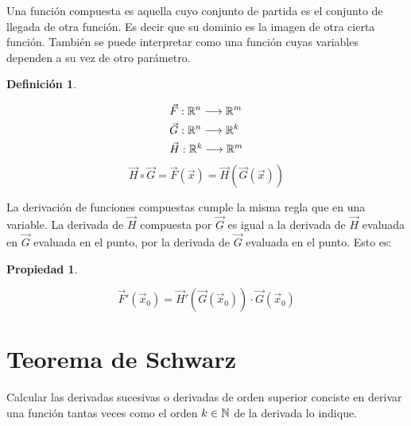 \documentclass[a5paper,12pt,twoside]{book}
\newtheorem{defn}{{Definición}}[chapter]
\newtheorem{prop}{{Propiedad}}[chapter]
\begin{document}
Una función compuesta es aquella cuyo conjunto de partida es el conjunto de llegada de otra función.
Es decir que su dominio es la imagen de otra cierta función.
También se puede interpretar como una función cuyas variables dependen a su vez de otro parámetro.
\clearpage
\begin{mdframed}[style=DefinitionFrame]
    \begin{defn}
    \end{defn}
    \begin{align*}
        & \Vec{F}:\mathbb{R}^n \longrightarrow \mathbb{R}^m
        \\
        & \Vec{G}:\mathbb{R}^n \longrightarrow \mathbb{R}^k
        \\
        & \Vec{H}:\mathbb{R}^k \longrightarrow \mathbb{R}^m
    \end{align*}
    \begin{equation*}
        \Vec{H} \circ \Vec{G} = \Vec{F}(\Vec{x})=\Vec{H} \left( \Vec{G}(\Vec{x}) \right)
    \end{equation*}
\end{mdframed}

La derivación de funciones compuestas cumple la misma regla que en una variable.
La derivada de $\Vec{H}$ compuesta por $\Vec{G}$ es igual a la derivada de $\Vec{H}$ evaluada en $\Vec{G}$ evaluada en el punto, por la derivada de $\Vec{G}$ evaluada en el punto.
Esto es:

\begin{mdframed}[style=PropertyFrame]
    \begin{prop}
    \end{prop}
    \begin{equation*}
        \Vec{F}'(\Vec{x}_0) = \Vec{H}' \left( \Vec{G}(\Vec{x}_0) \right) \cdot \Vec{G} \left( \Vec{x}_0 \right)
    \end{equation*}
\end{mdframed}


\section{Teorema de Schwarz}

Calcular las derivadas sucesivas o derivadas de orden superior conciste en derivar una función tantas veces como el orden $k \in \mathbb{N}$ de la derivada lo indique.
\end{document}

